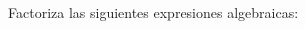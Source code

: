 \documentclass[12pt,addpoints]{evalua}
\begin{document}
\begin{questions}
\begin{multicols}{2}
      \end{multicols}


      \subsection*{\else{}\fi}
      \question[4] Factoriza las siguientes expresiones algebraicas:
      \begin{multicols}{2}
      \end{multicols}



\end{questions}
\end{document}
